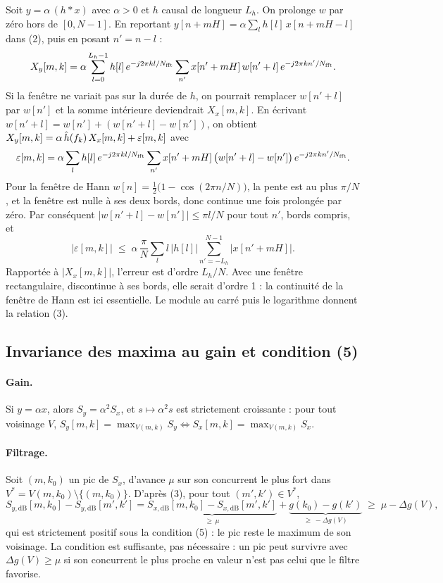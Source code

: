 Soit $y = \alpha\,(h * x)$ avec $\alpha > 0$ et $h$ causal de longueur $L_h$. On prolonge
$w$ par zéro hors de $[0, N-1]$. En reportant $y[n+mH] = \alpha\sum_l h[l]\,x[n+mH-l]$
dans (2), puis en posant $n' = n - l$ :
\begin{equation}
  X_y[m,k]
  = \alpha \sum_{l=0}^{L_h-1} h[l]\, e^{-j2\pi kl/N_{\mathrm{fft}}}
     \sum_{n'} x[n'+mH]\, w[n'+l]\, e^{-j2\pi kn'/N_{\mathrm{fft}}} .
  \label{eq-filtrage-exact}
\end{equation}
Si la fenêtre ne variait pas sur la durée de $h$, on pourrait remplacer $w[n'+l]$ par $w[n']$
et la somme intérieure deviendrait $X_x[m,k]$. En écrivant
$w[n'+l] = w[n'] + (w[n'+l] - w[n'])$, on obtient
$X_y[m,k] = \alpha\,\hat{h}(f_k)\, X_x[m,k] + \varepsilon[m,k]$ avec
\[
  \varepsilon[m,k] = \alpha \sum_{l} h[l]\, e^{-j2\pi kl/N_{\mathrm{fft}}}
  \sum_{n'} x[n'+mH]\,\bigl(w[n'+l] - w[n']\bigr)\, e^{-j2\pi kn'/N_{\mathrm{fft}}} .
\]
Pour la fenêtre de Hann $w[n] = \tfrac12\bigl(1 - \cos(2\pi n/N)\bigr)$, la pente est au
plus $\pi/N$, et la fenêtre est nulle à ses deux bords, donc continue une fois prolongée par
zéro. Par conséquent $|w[n'+l] - w[n']| \le \pi l/N$ pour tout $n'$, bords compris, et
\[
  |\varepsilon[m,k]| \;\le\; \alpha\,\frac{\pi}{N}
  \sum_{l} l\,|h[l]| \sum_{n'=-L_h}^{N-1} |x[n'+mH]| .
\]
Rapportée à $|X_x[m,k]|$, l'erreur est d'ordre $L_h/N$. Avec une fenêtre rectangulaire,
discontinue à ses bords, elle serait d'ordre 1 : la continuité de la fenêtre de Hann est ici
essentielle. Le module au carré puis le logarithme donnent la relation (3).

\subsection{Invariance des maxima au gain et condition (5)}
\label{sec-demo-maxima}

\paragraph{Gain.} Si $y = \alpha x$, alors $S_y = \alpha^2 S_x$, et $s \mapsto \alpha^2 s$ est
strictement croissante : pour tout voisinage $V$,
$S_y[m,k] = \max_{V(m,k)} S_y \iff S_x[m,k] = \max_{V(m,k)} S_x$.

\paragraph{Filtrage.} Soit $(m,k_0)$ un pic de $S_x$, d'avance $\mu$ sur son concurrent le
plus fort dans $V^* = V(m,k_0) \setminus \{(m,k_0)\}$. D'après (3), pour tout
$(m',k') \in V^*$,
\[
  S_{y,\mathrm{dB}}[m,k_0] - S_{y,\mathrm{dB}}[m',k']
  = \underbrace{S_{x,\mathrm{dB}}[m,k_0] - S_{x,\mathrm{dB}}[m',k']}_{\ge\, \mu}
  + \underbrace{g(k_0) - g(k')}_{\ge\, -\Delta g(V)}
  \;\ge\; \mu - \Delta g(V) ,
\]
qui est strictement positif sous la condition (5) : le pic reste le maximum de son voisinage.
La condition est suffisante, pas nécessaire : un pic peut survivre avec $\Delta g(V) \ge \mu$
si son concurrent le plus proche en valeur n'est pas celui que le filtre favorise.

